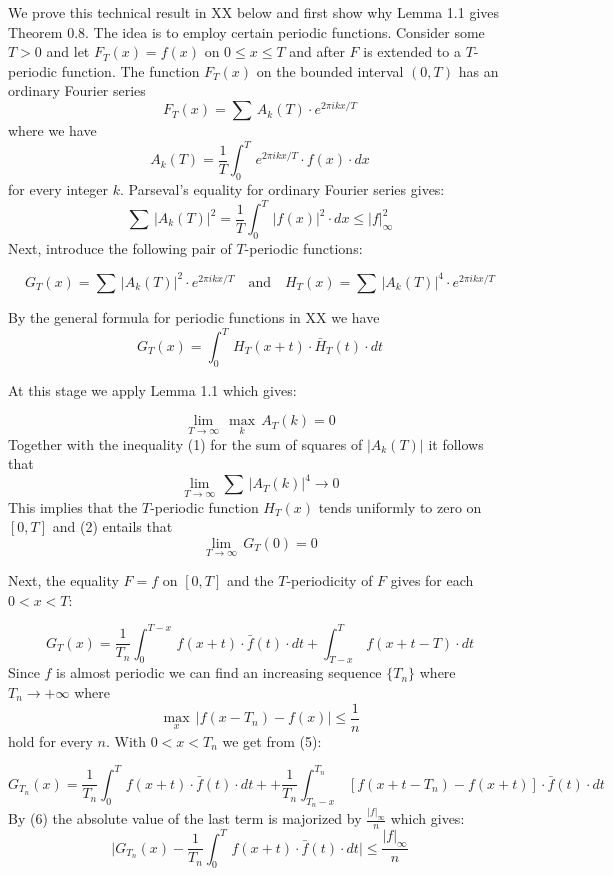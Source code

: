 \documentclass{amsart}
\def\uuu{_}
\def\vvv{-}
\begin{document}
\noindent
We prove this technical result in XX below and first show why
Lemma 1.1 gives Theorem 0.8.
The idea is to employ certain periodic functions.
Consider some $T>0$ and let
$F\uuu T(x)= f(x)$ on $0\leq x\leq T$ and after $F$ is extended to a
$T$\vvv periodic function.
The  function $F\uuu T(x)$ on the bounded interval 
$(0,T)$ has an ordinary Fourier series
\[
F\uuu T(x)= \sum\, A\uuu k(T)\cdot e^{2\pi i k x/T}
\]
where  we have
\[ 
A\uuu k(T)= \frac{1}{T}\int\uuu 0^T\, e^{2\pi i k x/T}\cdot f(x)\cdot dx
\]
for every integer $k$.
Parseval's equality for ordinary Fourier series gives:
\[
\sum\, |A\uuu k(T)|^2=\frac{1}{T}\int\uuu 0^T\, |f(x)|^2\cdot dx\leq |f|\uuu\infty^2\tag{1}
\]
Next, introduce the following pair  of $T$\vvv periodic functions:


\[ 
G\uuu T(x)= \sum\, |A\uuu k(T)|^2\cdot e^{2\pi i k x/T}
\quad\text{and}\quad 
H\uuu T(x)= \sum\, |A\uuu k(T)|^4\cdot e^{2\pi i k x/T}\tag{2}
\]

\medskip

\noindent
By the general formula for periodic functions
in XX we have
\[ 
G\uuu T(x)= \int\uuu 0^T\,H\uuu T(x+t)\cdot \bar H\uuu T(t)\cdot dt
\]

\noindent
At this stage we apply Lemma 1.1 which gives:

\[ 
\lim\uuu{T\to\infty}\, \max\uuu k\, A\uuu T(k)=0\tag{3}
\]
Together with the inequality (1) for the sum of squares of $|A\uuu k(T)|$
it follows that
\[ 
\lim\uuu{T\to \infty}\,\sum\,  |A\uuu T(k)|^4\to 0\tag{4}
\]
This implies that
the $T$\vvv periodic
function $H\uuu T(x)$ tends uniformly  to zero 
on $[0,T]$ and 
(2) entails that
\[
\lim\uuu{T\to \infty}\, G\uuu T(0)=0
\]

\medskip

\noindent
Next,
the equality $F=f$ on $[0,T]$
and the $T$\vvv periodicity of $F$ gives  for 
each $0<x<T$:


\[
G\uuu T(x)= \frac{1}{T\uuu n}\int\uuu 0^{T\vvv x}\,f(x+t)\cdot \bar f(t)\cdot dt
+\int\uuu{T\vvv x}^T\, f(x+t\vvv T)\cdot dt\tag{5}
\]
Since $f$ is almost periodic we can find
an increasing  sequence $\{T\uuu n\}$
where $T\uuu n\to+\infty$ where
\[
\max\uuu x\, |f(x\vvv T\uuu n)\vvv f(x)|\leq \frac{1}{n}\tag{6}
\]
hold for every $n$.
With $0<x<T\uuu n$ we get from (5):

\[ 
G\uuu{T\uuu n}(x)=\frac{1}{T\uuu n}\int\uuu 0^T\, 
f(x+t)\cdot \bar f(t)\cdot dt+
+\frac{1}{T\uuu n}\int\uuu {T\uuu n\vvv x}^{T\uuu n}
\,[f(x+t\vvv T\uuu n)\vvv f(x+t)]
\cdot \bar f(t)\cdot dt
\]
By (6) the absolute value of the last term is majorized by
$\frac{|f|\uuu\infty}{n}$ which gives:
\[
|G\uuu{T\uuu n}(x)\vvv
\frac{1}{T\uuu n}\int\uuu 0^T\,f(x+t)\cdot \bar f(t)\cdot dt
\bigl|\leq \frac{|f|\uuu\infty}{n}
\]
\medskip
\end{document}
